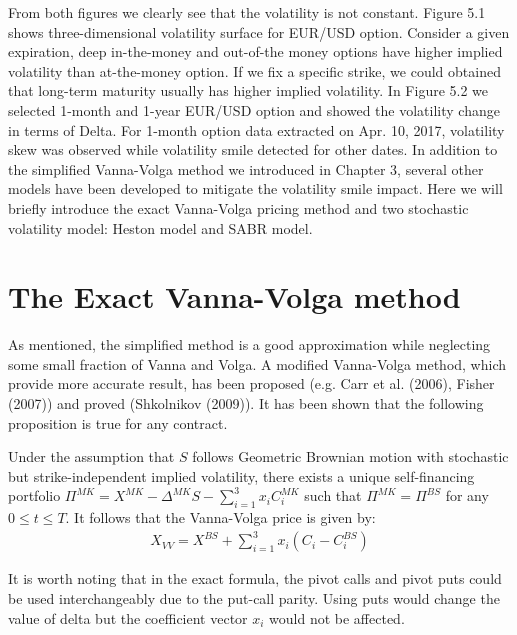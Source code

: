 \noindent
From both figures we clearly see that the volatility is not constant. Figure 5.1 shows three-dimensional volatility surface for EUR/USD option. Consider a given expiration, deep in-the-money and out-of-the money options have higher implied volatility than at-the-money option. If we fix a specific strike, we could obtained that long-term maturity usually has higher implied volatility.\newline\newline
In Figure 5.2 we selected 1-month and 1-year EUR/USD option and showed the volatility change in terms of Delta. For 1-month option  data extracted on Apr. 10, 2017, volatility skew was observed while volatility smile detected for other dates.
\newline\newline
In addition to the simplified Vanna-Volga method we introduced in Chapter 3, several other models have been developed to mitigate the volatility smile impact. Here we will briefly introduce the exact Vanna-Volga pricing method and two stochastic volatility model: Heston model and SABR model.

\section{The Exact Vanna-Volga method}
As mentioned, the simplified method is a good approximation while neglecting some small fraction of Vanna and Volga. A modified Vanna-Volga method, which provide more accurate result, has been proposed (e.g. Carr et al. (2006), Fisher (2007)) and proved (Shkolnikov (2009)). It has been shown that the following proposition is true for any contract.
\begin{prop}
	Under the assumption that $S$ follows Geometric Brownian motion with stochastic but strike-independent implied volatility, there exists a unique self-financing portfolio $\Pi^{MK} = X^{MK}-\Delta^{MK} S-\sum_{i=1}^{3}x_i C_i^{MK}$ such that $\Pi^{MK} = \Pi^{BS}$ for any $0 \leq t \leq T$. It follows that the Vanna-Volga price is given by:
	\begin{align}
	X_{VV} = X^{BS}+\sum_{i=1}^{3}x_i\left( C_i - C_{i}^{BS}\right) 
	\end{align}
\end{prop}
It is worth noting that in the exact formula, the pivot calls and pivot puts could be used interchangeably due to the put-call parity. Using puts would change the value of delta but the coefficient vector $x_i$ would not be affected. \newline

